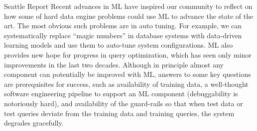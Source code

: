 \documentclass[acmsmall]{acmart}
\begin{document}
Seattle Report \cite{seattle-report} Recent advances in ML have inspired our community to reflect on how
some of hard data engine problems could use ML to advance the state of the art. The most obvious such problems are in auto tuning.
For example, we can systematically replace ``magic numbers'' in database systems with data-driven learning models and use them to auto-tune system configurations.
ML also provides new hope for progress in query optimization, which has seen only minor improvements in the last two decades.
Although in principle almost any component can potentially be improved with ML, answers to some key questions are prerequisites for success, such as availability of training data, a well-thought software engineering pipeline to support an ML component (debuggability is notoriously hard), and availability of the guard-rails so that when test data or test queries deviate from the training data and training queries, the system degrades gracefully.




\end{document}
